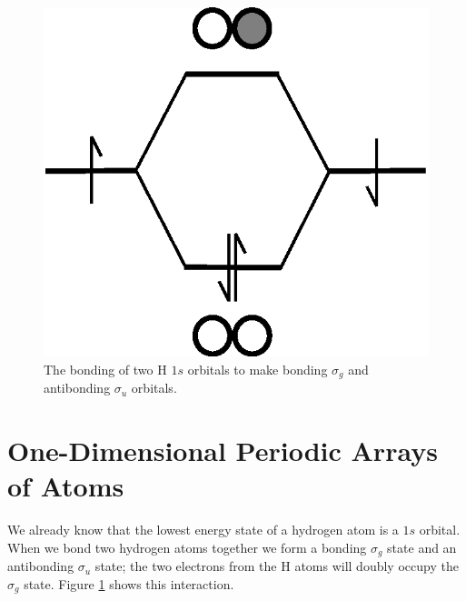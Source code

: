 \begin{figure}
\begin{center}
\includegraphics[scale=0.6]{h2-bonding.eps}
\caption{The bonding of two H $1s$ orbitals to make bonding $\sigma_g$
and antibonding $\sigma_u$ orbitals.}
\label{h2-bonding}
\end{center}
\end{figure}

\section{One-Dimensional Periodic Arrays of Atoms}
We already know that the lowest energy state of a hydrogen atom is a
$1s$ orbital. When we bond two hydrogen atoms together we form a
bonding $\sigma_g$ state and an antibonding $\sigma_u$ state; the two
electrons from the H atoms will doubly occupy the $\sigma_g$ state. 
Figure \ref{h2-bonding} shows this interaction.

